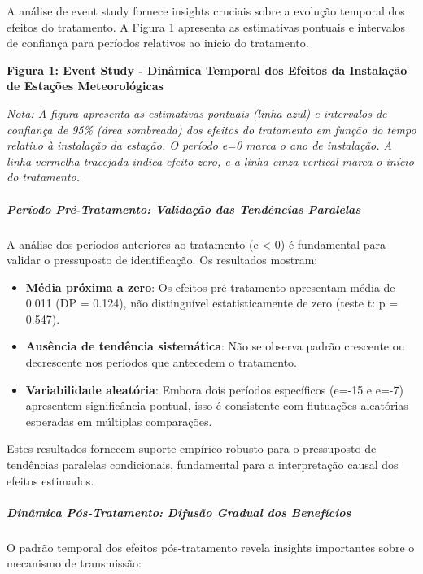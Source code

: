 \documentclass[
  brazilian,
  12pt,
  a4paper,
]{article}
\providecommand{\tightlist}{%
  \setlength{\itemsep}{0pt}\setlength{\parskip}{0pt}}
\begin{document}
A análise de event study fornece insights cruciais sobre a evolução
temporal dos efeitos do tratamento. A Figura 1 apresenta as estimativas
pontuais e intervalos de confiança para períodos relativos ao início do
tratamento.

\textbf{Figura 1: Event Study - Dinâmica Temporal dos Efeitos da
Instalação de Estações Meteorológicas}

\emph{Nota: A figura apresenta as estimativas pontuais (linha azul) e
intervalos de confiança de 95\% (área sombreada) dos efeitos do
tratamento em função do tempo relativo à instalação da estação. O
período e=0 marca o ano de instalação. A linha vermelha tracejada indica
efeito zero, e a linha cinza vertical marca o início do tratamento.}

\subparagraph{\texorpdfstring{\textbf{Período Pré-Tratamento: Validação
das Tendências
Paralelas}}{Período Pré-Tratamento: Validação das Tendências Paralelas}}\label{peruxedodo-pruxe9-tratamento-validauxe7uxe3o-das-tenduxeancias-paralelas}

A análise dos períodos anteriores ao tratamento (e \textless{} 0) é
fundamental para validar o pressuposto de identificação. Os resultados
mostram:

\begin{itemize}
\tightlist
\item
  \textbf{Média próxima a zero}: Os efeitos pré-tratamento apresentam
  média de 0.011 (DP = 0.124), não distinguível estatisticamente de zero
  (teste t: p = 0.547).
\item
  \textbf{Ausência de tendência sistemática}: Não se observa padrão
  crescente ou decrescente nos períodos que antecedem o tratamento.
\item
  \textbf{Variabilidade aleatória}: Embora dois períodos específicos
  (e=-15 e e=-7) apresentem significância pontual, isso é consistente
  com flutuações aleatórias esperadas em múltiplas comparações.
\end{itemize}

Estes resultados fornecem suporte empírico robusto para o pressuposto de
tendências paralelas condicionais, fundamental para a interpretação
causal dos efeitos estimados.

\subparagraph{\texorpdfstring{\textbf{Dinâmica Pós-Tratamento: Difusão
Gradual dos
Benefícios}}{Dinâmica Pós-Tratamento: Difusão Gradual dos Benefícios}}\label{dinuxe2mica-puxf3s-tratamento-difusuxe3o-gradual-dos-benefuxedcios}

O padrão temporal dos efeitos pós-tratamento revela insights importantes
sobre o mecanismo de transmissão:
\end{document}
